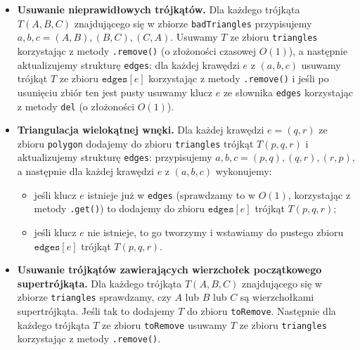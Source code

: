 \documentclass{myclass}
\begin{document}
\begin{itemize}
    \item \textbf{Usuwanie nieprawidłowych trójkątów.} Dla każdego trójkąta
    \(T(A,B,C)\) znajdującego się w zbiorze \texttt{badTriangles} przypisujemy
    \(a, b, c = (A,B), (B,C), (C,A)\). Usuwamy \(T\) ze zbioru
    \texttt{triangles} korzystając z metody \texttt{.remove()} (o złożoności
    czasowej \(O(1)\)), a następnie aktualizujemy strukturę \texttt{edges}: dla
    każdej krawędzi \(e\) z \((a,b,c)\) usuwamy trójkąt \(T\) ze zbioru
    \(\texttt{edges}[e]\) korzystając z metody \texttt{.remove()} i jeśli po
    usunięciu zbiór ten jest pusty usuwamy klucz \(e\) ze słownika
    \texttt{edges} korzystając z metody \texttt{del} (o złożoności \(O(1)\)).

    \item \textbf{Triangulacja wielokątnej wnęki.} Dla każdej krawędzi \(e =
    (q,r)\) ze zbioru \texttt{polygon} dodajemy do zbioru \texttt{triangles}
    trójkąt \(T(p,q,r)\) i aktualizujemy strukturę \texttt{edges}: przypisujemy
    \(a, b, c = (p,q), (q,r), (r,p)\), a następnie dla każdej krawędzi \(e\) z
    \((a,b,c)\) wykonujemy:
    \begin{itemize}
        \item jeśli klucz \(e\) istnieje już w \texttt{edges} (sprawdzamy to w
        \(O(1)\), korzystając z metody \texttt{.get()}) to dodajemy do zbioru
        \(\texttt{edges}[e]\) trójkąt \(T(p,q,r)\);

        \item jeśli klucz \(e\) nie istnieje, to go tworzymy i wstawiamy do
        pustego zbioru \(\texttt{edges}[e]\) trójkąt \(T(p,q,r)\).
    \end{itemize}
    
    \item \textbf{Usuwanie trójkątów zawierających wierzchołek początkowego
    supertrójkąta.} Dla każdego trójkąta \(T(A,B,C)\) znajdującego się w zbiorze
    \texttt{triangles} sprawdzamy, czy \(A\) lub \(B\) lub \(C\) są
    wierzchołkami supertrójkąta. Jeśli tak to dodajemy \(T\) do zbioru
    \texttt{toRemove}. Następnie dla każdego trójkąta \(T\) ze zbioru
    \texttt{toRemove} usuwamy \(T\) ze zbioru \texttt{triangles} korzystając z
    metody \texttt{.remove()}.


\end{itemize}
\end{document}
